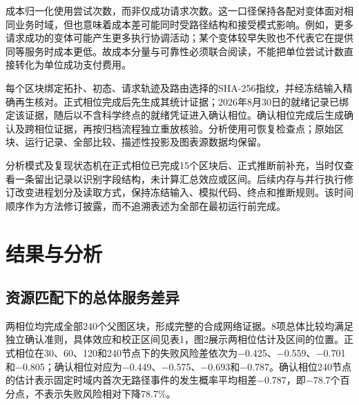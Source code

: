 \documentclass[UTF8,a4paper,twocolumn,fontset=none,zihao=5]{ctexart}
\begin{document}
成本归一化使用尝试次数，而非仅成功请求次数。这一口径保持各配对变体面对相同业务时域，但也意味着成本差可能同时受路径结构和接受模式影响。例如，更多请求成功的变体可能产生更多执行协调活动；某个变体较早失败也不代表它在提供同等服务时成本更低。故成本分量与可靠性必须联合阅读，不能把单位尝试计数直接转化为单位成功支付费用。


每个区块绑定拓扑、初态、请求轨迹及路由选择的SHA-256指纹，并经冻结输入精确再生核对。正式相位完成后先生成其统计证据；2026年8月30日的就绪记录已绑定该证据，随后以不含科学终点的就绪凭证进入确认相位。确认相位完成后生成确认及跨相位证据，再按归档流程独立重放核验。分析使用可恢复检查点；原始区块、运行记录、全部比较、描述性投影及图表源数据均保留。


分析模式及复现状态机在正式相位已完成15个区块后、正式推断前补充，当时仅查看一条留出记录以识别字段结构，未计算汇总效应或区间。后续内存与并行执行修订改变进程划分及读取方式，保持冻结输入、模拟代码、终点和推断规则。该时间顺序作为方法修订披露，而不追溯表述为全部在最初运行前完成。


\section{结果与分析}

\subsection{资源匹配下的总体服务差异}

两相位均完成全部240个父图区块，形成完整的合成网络证据。8项总体比较均满足独立确认准则，具体效应和校正区间见表1，图2展示两相位估计及区间的位置。正式相位在30、60、120和240节点下的失败风险差依次为$-$0.425、$-$0.559、$-$0.701和$-$0.805；确认相位对应为$-$0.449、$-$0.575、$-$0.693和$-$0.787。确认相位240节点的估计表示固定时域内首次无路径事件的发生概率平均相差$-$0.787，即$-$78.7个百分点，不表示失败风险相对下降78.7\%。
\end{document}
